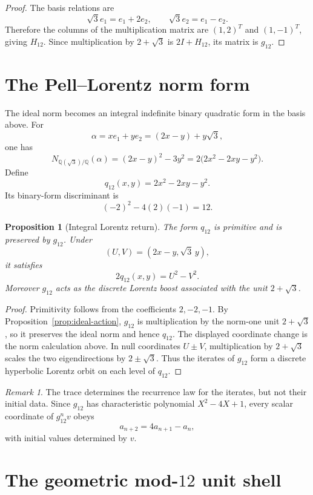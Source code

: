\documentclass[11pt]{article}
\newtheorem{proposition}[theorem]{Proposition}
\theoremstyle{definition}
\theoremstyle{remark}
\newtheorem{remark}[theorem]{Remark}
\newcommand{\Q}{\mathbb Q}
\begin{document}
\begin{proof}
The basis relations are
\[
\sqrt3e_1=e_1+2e_2,
\qquad
\sqrt3e_2=e_1-e_2.
\]
Therefore the columns of the multiplication matrix are $(1,2)^T$ and
$(1,-1)^T$, giving $H_{12}$.  Since multiplication by $2+\sqrt3$ is
$2I+H_{12}$, its matrix is $g_{12}$.
\end{proof}

\section{The Pell--Lorentz norm form}

The ideal norm becomes an integral indefinite binary quadratic form in the
basis above.  For
\[
\alpha=xe_1+ye_2=(2x-y)+y\sqrt3,
\]
one has
\[
N_{\Q(\sqrt3)/\Q}(\alpha)
=(2x-y)^2-3y^2
=2\bigl(2x^2-2xy-y^2\bigr).
\]
Define
\[
q_{12}(x,y)=2x^2-2xy-y^2.
\]
Its binary-form discriminant is
\[
(-2)^2-4(2)(-1)=12.
\]

\begin{proposition}[Integral Lorentz return]
\label{prop:lorentz-return}
The form $q_{12}$ is primitive and is preserved by $g_{12}$.  Under
\[
(U,V)=(2x-y,\sqrt3\,y),
\]
it satisfies
\[
\boxed{2q_{12}(x,y)=U^2-V^2.}
\]
Moreover $g_{12}$ acts as the discrete Lorentz boost associated with the unit
$2+\sqrt3$.
\end{proposition}

\begin{proof}
Primitivity follows from the coefficients $2,-2,-1$.  By
Proposition~\ref{prop:ideal-action}, $g_{12}$ is multiplication by the norm-one
unit $2+\sqrt3$, so it preserves the ideal norm and hence $q_{12}$.  The
displayed coordinate change is the norm calculation above.  In null
coordinates $U\pm V$, multiplication by $2+\sqrt3$ scales the two eigendirections
by $2\pm\sqrt3$.  Thus the iterates of $g_{12}$ form a discrete hyperbolic
Lorentz orbit on each level of $q_{12}$.
\end{proof}

\begin{remark}
The trace determines the recurrence law for the iterates, but not their
initial data.  Since $g_{12}$ has characteristic polynomial
$X^2-4X+1$, every scalar coordinate of $g_{12}^nv$ obeys
\[
a_{n+2}=4a_{n+1}-a_n,
\]
with initial values determined by $v$.
\end{remark}

\section{The geometric mod-$12$ unit shell}
\label{sec:mod12-shell}
\end{document}
